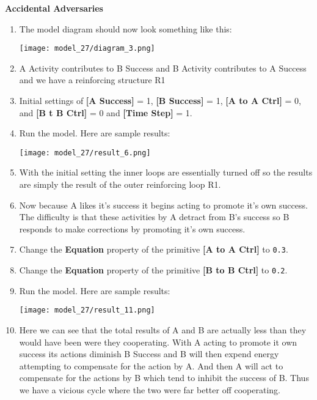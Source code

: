 \documentclass[]{memoir}
\makeatletter
\def\maxwidth{\ifdim\Gin@nat@width>\linewidth\linewidth
\else\Gin@nat@width\fi}
\let\Oldincludegraphics\includegraphics
\renewcommand{\includegraphics}[1]{\Oldincludegraphics[width=\maxwidth]{#1}}
\newcommand{\p}[1]{\textbf{{[}#1{]}}}
\newcommand{\e}[1]{\texttt{#1}}
\renewcommand{\a}[1]{\textbf{#1}}
\makeatother
\begin{document}
\FloatBarrier 

\begin{oframed}\textbf{Accidental Adversaries} 

 \begin{enumerate}
\item The model diagram should now look something like this: \par \begin{minipage}{\linewidth}  \centering \texttt{[image: model\_27/diagram\_3.png]}
\end{minipage}
\item 

A Activity contributes to B Success and B Activity contributes to A Success and we have a reinforcing structure R1


\item 

Initial settings of \p{A Success} = 1, \p{B Success} = 1, \p{A to A Ctrl} = 0, and \p{B t B Ctrl} = 0 and \p{Time Step} = 1.


\item Run the model. Here are sample results:\par \begin{minipage}{\linewidth}  \centering \texttt{[image: model\_27/result\_6.png]}
\end{minipage}
\item 

With the initial setting the inner loops are essentially turned off so the results are simply the result of the outer reinforcing loop R1.


\item 

Now because A likes it's success it begins acting to promote it's own success. The difficulty is that these activities by A detract from B's success so B responds to make corrections by promoting it's own success.


\item  Change the \a{Equation} property of the primitive \p{A to A Ctrl} to \e{0.3}.
\item  Change the \a{Equation} property of the primitive \p{B to B Ctrl} to \e{0.2}.
\item Run the model. Here are sample results:\par \begin{minipage}{\linewidth}  \centering \texttt{[image: model\_27/result\_11.png]}
\end{minipage}
\item 

Here we can see that the total results of A and B are actually less than they would have been were they cooperating. With A acting to promote it own success its actions diminish B Success and B will then expend energy attempting to compensate for the action by A. And then A will act to compensate for the actions by B which tend to inhibit the success of B. Thus we have a vicious cycle where the two were far better off cooperating.



\end{enumerate} \end{oframed}
\end{document}
